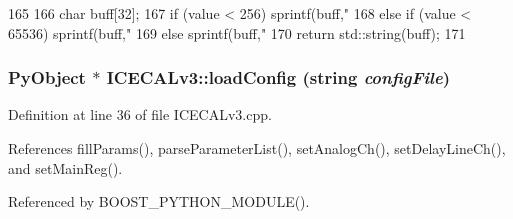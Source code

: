 \begin{DoxyCode}
165     {
166         char buff[32];
167       if      (value < 256)   sprintf(buff,"%
168         else if (value < 65536) sprintf(buff,"%
169         else                                    sprintf(buff,"%
170         return std::string(buff);
171     }
\end{DoxyCode}
\hypertarget{classICECALv3_a514456dd303e897aa1b55dccf3fa66d0}{
\subsubsection[{loadConfig}]{\setlength{\rightskip}{0pt plus 5cm}PyObject $\ast$ ICECALv3::loadConfig (string {\em configFile})}}
\label{classICECALv3_a514456dd303e897aa1b55dccf3fa66d0}


Definition at line 36 of file ICECALv3.cpp.

References fillParams(), parseParameterList(), setAnalogCh(), setDelayLineCh(), and setMainReg().

Referenced by BOOST\_\-PYTHON\_\-MODULE().


